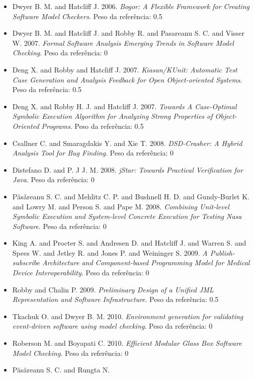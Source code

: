 \begin{itemize}
\item Dwyer B. M. and Hatcliff J.
      2006.
      {\it Bogor: A Flexible Framework for Creating Software Model Checkers}.
      Peso da referência: 0.5
\item Dwyer B. M. and Hatcliff J. and Robby R. and Pasareanu S. C. and Visser W.
      2007.
      {\it Formal Software Analysis Emerging Trends in Software Model Checking}.
      Peso da referência: 0
\item Deng X. and Robby and Hatcliff J.
      2007.
      {\it Kiasan/KUnit: Automatic Test Case Generation and Analysis Feedback for Open Object-oriented Systems}.
      Peso da referência: 0.5
\item Deng X. and Robby H. J. and Hatcliff J.
      2007.
      {\it Towards A Case-Optimal Symbolic Execution Algorithm for Analyzing Strong Properties of Object-Oriented Programs}.
      Peso da referência: 0.5
\item Csallner C. and Smaragdakis Y. and Xie T.
      2008.
      {\it DSD-Crasher: A Hybrid Analysis Tool for Bug Finding}.
      Peso da referência: 0
\item Distefano D. and P. J J. M.
      2008.
      {\it jStar: Towards Practical Verification for Java}.
      Peso da referência: 0
\item P\v{a}s\v{a}reanu S. C. and Mehlitz C. P. and Bushnell H. D. and Gundy-Burlet K. and Lowry M. and Person S. and Pape M.
      2008.
      {\it Combining Unit-level Symbolic Execution and System-level Concrete Execution for Testing Nasa Software}.
      Peso da referência: 0
\item King A. and Procter S. and Andresen D. and Hatcliff J. and Warren S. and Spees W. and Jetley R. and Jones P. and Weininger S.
      2009.
      {\it A Publish-subscribe Architecture and Component-based Programming Model for Medical Device Interoperability}.
      Peso da referência: 0
\item Robby and Chalin P.
      2009.
      {\it Preliminary Design of a Unified JML Representation and Software Infrastructure}.
      Peso da referência: 0.5
\item Tkachuk O. and Dwyer B. M.
      2010.
      {\it Environment generation for validating event-driven software using model checking}.
      Peso da referência: 0
\item Roberson M. and Boyapati C.
      2010.
      {\it Efficient Modular Glass Box Software Model Checking}.
      Peso da referência: 0
\item P\u{a}s\u{a}reanu S. C. and Rungta N.

\end{itemize}
